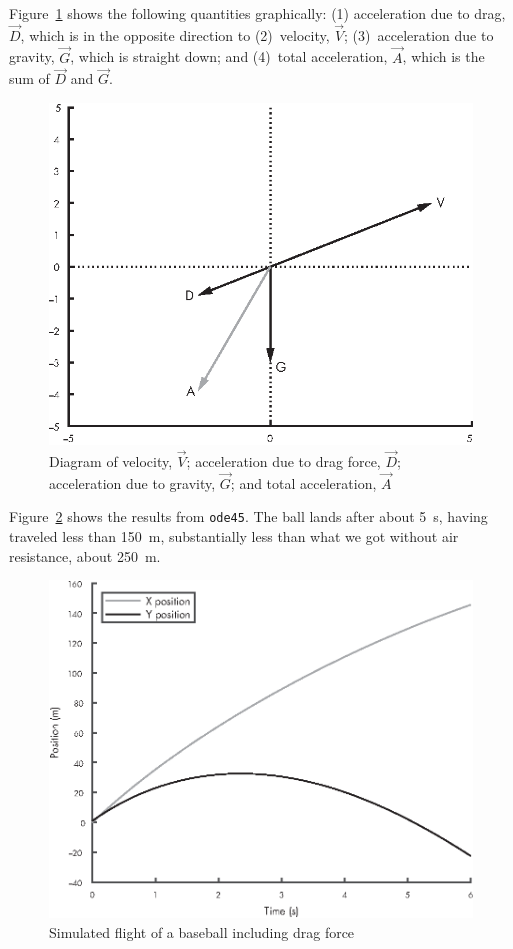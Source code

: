 Figure~\ref{fig:vector3} shows the following quantities graphically:  (1) acceleration due to drag, $\vec{D}$, which is in the opposite direction to (2)~velocity, $\vec{V}$; (3)~acceleration due to gravity, $\vec{G}$, which is straight down; and (4)~total acceleration, $\vec{A}$, which is the sum of $\vec{D}$ and $\vec{G}$.

\begin{figure}[h]
\includegraphics{images/figure12_03_new.eps}
\caption{Diagram of velocity, $\vec{V}$; acceleration due to drag force, 
$\vec{D}$; acceleration due to gravity, $\vec{G}$; and total acceleration, $\vec{A}$}
\label{fig:vector3}
\end{figure}


Figure~\ref{fig:baseball2} shows the results from \lstinline{ode45}.  The ball lands after about \SI{5}{\second}, having traveled less than \SI{150}{\meter}, substantially less than what we got without air resistance, about \SI{250}{\meter}.

\begin{figure}[h]
\includegraphics{images/figure12_04_new.eps}
\caption{Simulated flight of a baseball including drag force}
\label{fig:baseball2}
\end{figure}


